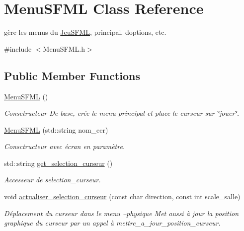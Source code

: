 \hypertarget{classMenuSFML}{}\section{Menu\+S\+F\+ML Class Reference}
\label{classMenuSFML}


gère les menus du \hyperlink{classJeuSFML}{Jeu\+S\+F\+ML}, principal, d\textquotesingle{}options, etc.  




{\ttfamily \#include $<$Menu\+S\+F\+M\+L.\+h$>$}

\subsection*{Public Member Functions}
\begin{DoxyCompactItemize}
\item 
\hyperlink{classMenuSFML_a9a0f8c81e03ba0d02c04bdcf74fdcad2}{Menu\+S\+F\+ML} ()
\begin{DoxyCompactList}\small\item\em Consctructeur De base, crée le menu principal et place le curseur sur \char`\"{}jouer\char`\"{}. \end{DoxyCompactList}\item 
\hyperlink{classMenuSFML_a2abbac1f7c265afcd1524379bfbfc631}{Menu\+S\+F\+ML} (std\+::string nom\+\_\+ecr)
\begin{DoxyCompactList}\small\item\em Consctructeur avec écran en paramètre. \end{DoxyCompactList}\item 
std\+::string \hyperlink{classMenuSFML_ae295ce7a37e0c5418cfd5908b540f6e2}{get\+\_\+selection\+\_\+curseur} ()
\begin{DoxyCompactList}\small\item\em Accesseur de {\itshape selection\+\_\+curseur}. \end{DoxyCompactList}\item 
void \hyperlink{classMenuSFML_ae6b395eb78ae4c0ad3621cfa14c6e11d}{actualiser\+\_\+selection\+\_\+curseur} (const char direction, const int scale\+\_\+salle)
\begin{DoxyCompactList}\small\item\em Déplacement du curseur dans le menu --physique Met aussi à jour la position graphique du curseur par un appel à mettre\+\_\+a\+\_\+jour\+\_\+position\+\_\+curseur. \end{DoxyCompactList}\item 

\end{DoxyCompactItemize}
